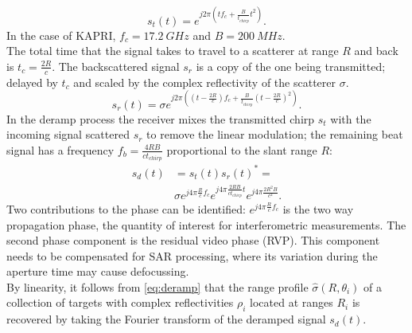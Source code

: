 \begin{equation}
	s_t\left(t\right) = e^{j 2 \pi \left( t f_{c} +  \frac{B}{t_{chirp}} t^2 \right)}.
\end{equation}
In the case of KAPRI, $f_c= 17.2~GHz$ and $B=200~MHz$.\\
The total time that the signal takes to travel to a scatterer at range $R$ and back is $t_{c} = \frac{2 R}{c}$. The backscattered signal $s_r$ is a copy of the one being transmitted; delayed by $t_{c}$ and scaled by the complex reflectivity of the scatterer $\sigma$.
\begin{equation}
		s_r\left(t\right) = \sigma e^{j 2 \pi \left( \left(t - \frac{2 R}{c}\right) f_{c} +  \frac{B}{t_{chirp}} \left(t - \frac{2 R}{c}\right)^2 \right)}.
\end{equation}
In the deramp process the receiver mixes the transmitted chirp $s_t$ with the incoming signal scattered $s_r$ to remove the linear modulation; the remaining beat signal has a frequency $f_{b} = \frac{4 R B}{c t_{chirp}}$ proportional to the slant range $R$:
\begin{equation}\label{eq:deramp}
	\begin{aligned}
	s_{d}\left(t\right) &=s_t\left(t\right)s_r\left(t\right)^* =\\ 
	&\sigma e^{j 4 \pi \frac{ R}{c}f_c}  e^{j 4 \pi \frac{2 R B }{c t_{chirp}} t}  e^{j 4 \pi \frac{2 R^2 B}{c^2}}.
	\end{aligned}
\end{equation} 
Two contributions to the phase can be identified: $ e^{j 4 \pi \frac{R}{c}f_c}$ is the two way propagation phase, the quantity of interest for  interferometric measurements. The second phase component is the residual video phase (RVP). This component needs to be compensated for SAR processing, where its variation during the aperture time may cause defocussing.\\
By linearity, it follows from \autoref{eq:deramp} that the range profile $\hat{\sigma}\left(R, \theta_{i}\right)$ of a collection of targets with complex reflectivities $\rho_i$ located at ranges $R_{i}$ is recovered by taking the Fourier transform of the deramped signal $s_{d}\left(t\right)$.\\
